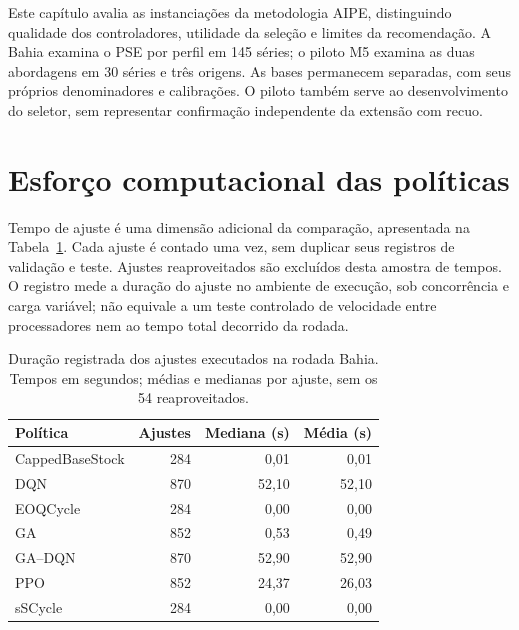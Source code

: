 
Este capítulo avalia as instanciações da metodologia AIPE, distinguindo qualidade dos controladores, utilidade da seleção e limites da recomendação. A Bahia examina o PSE por perfil em 145 séries; o piloto M5 examina as duas abordagens em 30 séries e três origens. As bases permanecem separadas, com seus próprios denominadores e calibrações. O piloto também serve ao desenvolvimento do seletor, sem representar confirmação independente da extensão com recuo.





\section{Esforço computacional das políticas}

\label{sec:computational_results}

Tempo de ajuste é uma dimensão adicional da comparação, apresentada na Tabela~\ref{tab:fit_time}. Cada ajuste é contado uma vez, sem duplicar seus registros de validação e teste. Ajustes reaproveitados são excluídos desta amostra de tempos. O registro mede a duração do ajuste no ambiente de execução, sob concorrência e carga variável; não equivale a um teste controlado de velocidade entre processadores nem ao tempo total decorrido da rodada.

\begin{table}[htbp]\centering\small
\caption{Duração registrada dos ajustes executados na rodada Bahia. Tempos em segundos; médias e medianas por ajuste, sem os 54 reaproveitados.}
\label{tab:fit_time}
\begin{tabular}{@{}lrrr@{}}\toprule
Política & Ajustes & Mediana (s) & Média (s)\\\midrule
CappedBaseStock & 284 & 0,01 & 0,01\\
DQN & 870 & 52,10 & 52,10\\
EOQCycle & 284 & 0,00 & 0,00\\
GA & 852 & 0,53 & 0,49\\
GA--DQN & 870 & 52,90 & 52,90\\
PPO & 852 & 24,37 & 26,03\\
sSCycle & 284 & 0,00 & 0,00\\
\bottomrule\end{tabular}\end{table}


